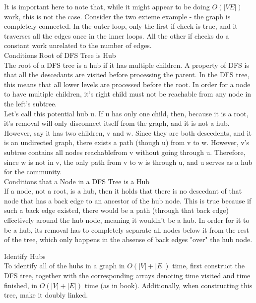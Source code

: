 \documentclass[12pt,twoside]{article}
\begin{document}
\begin{problems}
\begin{problemparts}
It is important here to note that, while it might appear to be doing $O(|VE|)$ work, this is not the case.  Consider the two exteme example - the graph is completely connected.  In the outer loop, only the first if check is true, and it traverses all the edges once in the inner loops.  All the other if checks do a constant work unrelated to the number of edges. 
\\

\problempart Conditions Root of DFS Tree is Hub\\
The root of a DFS tree is a hub if it has multiple children.  A property of DFS is that all the descedants are visited before processing the parent. In the DFS tree, this means that all lower levels are processed before the root.  In order for a node to have multiple children, it's right child must not be reachable from any node in the left's subtree.\\

Let's call this potential hub u. If u has only one child, then, because it is a root, it's removal will only disconnect itself from the graph, and it is not a hub.  However, say it has two children, v and w.  Since they are both descedents, and it is an undirected graph, there exists a path (though u) from v to w.  However, v's subtree contains all nodes reachablefrom v without going through u.  Therefore, since w is not in v, the only path from v to w is through u, and u serves as a hub for the community.\\

\problempart Conditions that a Node in a DFS Tree is a Hub\\
If a node, not a root, is a hub, then it holds that there is no descedant of that node that has a back edge to an ancestor of the hub node.  This is true because if such a back edge existed, there would be a path (through that back edge) effectively around the hub node, meaning it wouldn't be a hub. In order for it to be a hub, its removal has to completely separate all nodes below it from the rest of the tree, which only happens in the absense of back edges "over" the hub node.

\problempart Identify Hubs\\
To identify all of the hubs in a graph in $O(|V|+|E|)$ time, first construct the DFS tree, together with the corresponding arrays denoting time visited and time finished, in $O(|V|+|E|)$ time (as in book). Additionally, when constructing this tree, make it doubly linked.\\


\end{problemparts}
\end{problems}
\end{document}

